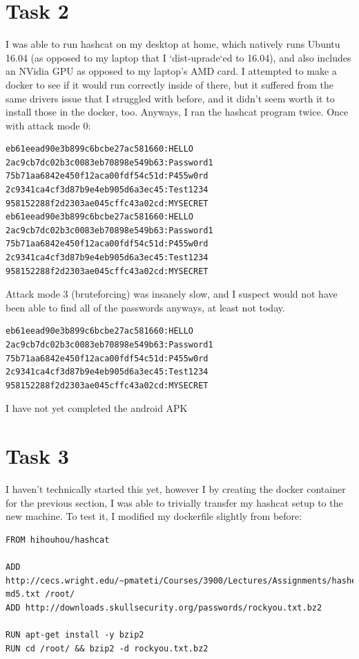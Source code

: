 \documentclass{article}
\begin{document}
\clearpage

\section{Task 2}
I was able to run hashcat on my desktop at home, which natively runs Ubuntu 16.04 (as opposed to my laptop that I `dist-uprade`ed to 16.04), and also includes an NVidia GPU as opposed to my laptop's AMD card.
I attempted to make a docker to see if it would run correctly inside of there, but it suffered from the same drivers issue that I struggled with before, and it didn't seem worth it to install those in the docker, too.
Anyways, I ran the hashcat program twice. Once with attack mode 0:

\begin{verbatim}
eb61eead90e3b899c6bcbe27ac581660:HELLO
2ac9cb7dc02b3c0083eb70898e549b63:Password1
75b71aa6842e450f12aca00fdf54c51d:P455w0rd
2c9341ca4cf3d87b9e4eb905d6a3ec45:Test1234
958152288f2d2303ae045cffc43a02cd:MYSECRET
eb61eead90e3b899c6bcbe27ac581660:HELLO
2ac9cb7dc02b3c0083eb70898e549b63:Password1
75b71aa6842e450f12aca00fdf54c51d:P455w0rd
2c9341ca4cf3d87b9e4eb905d6a3ec45:Test1234
958152288f2d2303ae045cffc43a02cd:MYSECRET
\end{verbatim}

Attack mode 3 (bruteforcing) was insanely slow, and I suspect would not have been able to find all of the passwords anyways, at least not today.
\begin{verbatim}
eb61eead90e3b899c6bcbe27ac581660:HELLO
2ac9cb7dc02b3c0083eb70898e549b63:Password1
75b71aa6842e450f12aca00fdf54c51d:P455w0rd
2c9341ca4cf3d87b9e4eb905d6a3ec45:Test1234
958152288f2d2303ae045cffc43a02cd:MYSECRET
\end{verbatim}

I have not yet completed the android APK

\section{Task 3}
I haven't technically started this yet, however I by creating the docker container for the previous section, I was able to trivially transfer my hashcat setup to the new machine.
To test it, I modified my dockerfile slightly from before:


\begin{verbatim}
FROM hihouhou/hashcat

ADD http://cecs.wright.edu/~pmateti/Courses/3900/Lectures/Assignments/hashes-md5.txt /root/
ADD http://downloads.skullsecurity.org/passwords/rockyou.txt.bz2

RUN apt-get install -y bzip2
RUN cd /root/ && bzip2 -d rockyou.txt.bz2
\end{verbatim}
\end{document}
